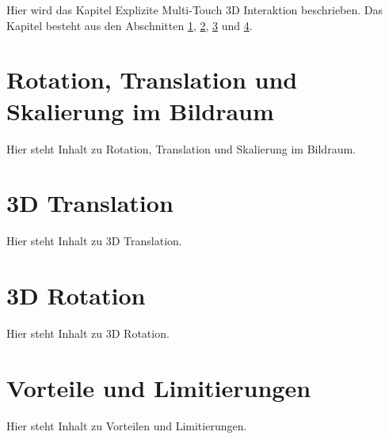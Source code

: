 Hier wird das Kapitel Explizite Multi-Touch 3D Interaktion beschrieben. Das Kapitel besteht aus den Abschnitten \ref{sec:rst_im_bildraum}, \ref{sec:3d_translation}, \ref{sec:3d_rotation} und \ref{sec:vorteile_und_limitierungen_explizit}.


\section{Rotation, Translation und Skalierung im Bildraum}
\label{sec:rst_im_bildraum}

Hier steht Inhalt zu Rotation, Translation und Skalierung im Bildraum.


\section{3D Translation}
\label{sec:3d_translation}

Hier steht Inhalt zu 3D Translation.


\section{3D Rotation}
\label{sec:3d_rotation}

Hier steht Inhalt zu 3D Rotation.


\section{Vorteile und Limitierungen}
\label{sec:vorteile_und_limitierungen_explizit}

Hier steht Inhalt zu Vorteilen und Limitierungen.